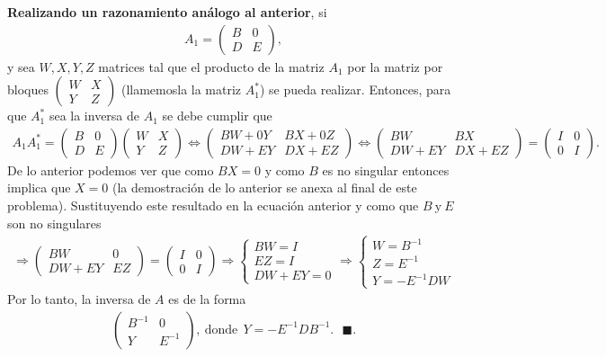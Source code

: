 \documentclass[11pt,letterpaper]{article}
\newcommand{\finf}{\blacksquare.}
\begin{document}
\begin{enumerate}
\textbf{Realizando un razonamiento análogo al anterior}, si 
\begin{align*}
A_1=\begin{pmatrix}
B&0\\
D&E
\end{pmatrix},
\end{align*}
 y sea $W,X,Y,Z$ matrices tal que el producto de la matriz $A_1$ por la matriz por bloques $
\begin{pmatrix}
W & X\\
Y & Z
\end{pmatrix}
$ (llamemosla la matriz $A_1^*$) se pueda realizar. Entonces, para que $A_1^*$ sea la inversa de $A_1$ se debe cumplir que 
\begin{align*}
A_1A_1^{*}=\begin{pmatrix}
B & 0 \\
D & E
\end{pmatrix}\begin{pmatrix}
W & X\\
Y & Z
\end{pmatrix}\Leftrightarrow \begin{pmatrix}
BW+0Y & BX+0Z\\
DW+EY & DX+EZ
\end{pmatrix}\Leftrightarrow \begin{pmatrix}
BW & BX\\
DW+EY & DX+EZ
\end{pmatrix}=\begin{pmatrix}
I&0\\
0&I
\end{pmatrix}.
\end{align*}
De lo anterior podemos ver que como $BX=0$ y como $B$ es no singular entonces implica que $X=0$ (la demostración de lo anterior se anexa al final de este problema). Sustituyendo este resultado en la ecuación anterior y como que $B\ \text{y} \ E$ son no singulares
\begin{align*}
\Rightarrow \begin{pmatrix}
BW & 0\\
DW+EY & EZ
\end{pmatrix}=\begin{pmatrix}
I&0\\
0&I
\end{pmatrix}\Rightarrow\left\{\begin{array}{c}
BW=I\\
EZ=I\\
DW+EY=0
\end{array} \right. \Rightarrow 
\left\{\begin{array}{c}
W=B^{-1}\\
Z=E^{-1}\\
Y=-E^{-1}DW
\end{array} \right.
\end{align*}
Por lo tanto, la inversa de $A$ es de la forma
\begin{align*}
\begin{pmatrix}
B^{-1} & 0\\
Y& E^{-1}
\end{pmatrix}, \ \text{donde}\ \  Y=-E^{-1}DB^{-1}.\ \ \ \finf
\end{align*}


\end{enumerate}
\end{document}
